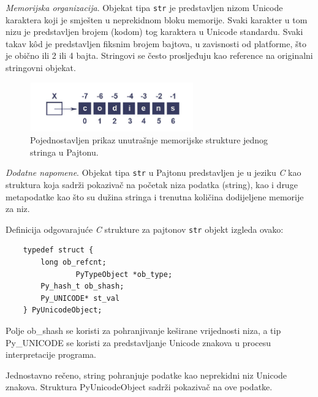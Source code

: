 \textit{Memorijska organizacija}. Objekat tipa \texttt{str} je predstavljen nizom Unicode karaktera koji je smješten u neprekidnom bloku memorije. Svaki karakter u tom nizu je predstavljen brojem (kodom) tog karaktera u Unicode standardu. Svaki takav k\^od je predstavljen fiksnim brojem bajtova, u zavisnosti od platforme, što je obično ili 2 ili 4 bajta. Stringovi se često prosljeđuju kao reference na originalni stringovni objekat. %

	\begin{figure}
	\centering
	\includegraphics[width=200pt,height=60pt]{slike/str_mem_organization.png}
	\caption{Pojednostavljen prikaz unutrašnje memorijske strukture jednog stringa   u Pajtonu. }
\end{figure}


\textit{Dodatne napomene}. Objekat tipa \texttt{str} u Pajtonu predstavljen je u jeziku \textit{C} kao struktura koja sadrži pokazivač na početak niza podatka (string), kao i druge metapodatke kao što su dužina stringa i trenutna količina dodijeljene memorije za niz.

Definicija odgovarajuće \textit{C} strukture za pajtonov \texttt{str} objekt izgleda ovako:

\begin{verbatim}
	typedef struct {
		long ob_refcnt;
                PyTypeObject *ob_type;
		Py_hash_t ob_shash;
		Py_UNICODE* st_val
	} PyUnicodeObject;
\end{verbatim}

Polje ob\_shash se koristi za pohranjivanje keširane vrijednosti niza, a tip Py\_UNICODE se koristi za predstavljanje Unicode znakova u procesu interpretacije programa. %
 
Jednostavno rečeno, string  pohranjuje  podatke kao neprekidni niz Unicode znakova. %
Struktura PyUnicodeObject sadrži pokazivač na ove podatke.


